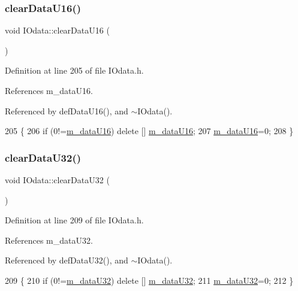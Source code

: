 \subsubsection{\texorpdfstring{clear\+Data\+U16()}{clearDataU16()}}
{\footnotesize\ttfamily void I\+Odata\+::clear\+Data\+U16 (\begin{DoxyParamCaption}{ }\end{DoxyParamCaption})\hspace{0.3cm}{\ttfamily [inline]}}



Definition at line 205 of file I\+Odata.\+h.



References m\+\_\+data\+U16.



Referenced by def\+Data\+U16(), and $\sim$\+I\+Odata().


\begin{DoxyCode}
205                      \{
206     \textcolor{keywordflow}{if} (0!=\hyperlink{classIOdata_a8d698e077b7898009691b9086a3e6453}{m\_dataU16}) \textcolor{keyword}{delete} [] \hyperlink{classIOdata_a8d698e077b7898009691b9086a3e6453}{m\_dataU16};
207     \hyperlink{classIOdata_a8d698e077b7898009691b9086a3e6453}{m\_dataU16}=0;
208   \}
\end{DoxyCode}
\mbox{\label{classIOdata_a848de1b6e7b7207dbb53c102a4d911a9}} 
\subsubsection{\texorpdfstring{clear\+Data\+U32()}{clearDataU32()}}
{\footnotesize\ttfamily void I\+Odata\+::clear\+Data\+U32 (\begin{DoxyParamCaption}{ }\end{DoxyParamCaption})\hspace{0.3cm}{\ttfamily [inline]}}



Definition at line 209 of file I\+Odata.\+h.



References m\+\_\+data\+U32.



Referenced by def\+Data\+U32(), and $\sim$\+I\+Odata().


\begin{DoxyCode}
209                      \{
210     \textcolor{keywordflow}{if} (0!=\hyperlink{classIOdata_a247cdaefd87084e3cad1d530d592d99a}{m\_dataU32}) \textcolor{keyword}{delete} [] \hyperlink{classIOdata_a247cdaefd87084e3cad1d530d592d99a}{m\_dataU32};
211     \hyperlink{classIOdata_a247cdaefd87084e3cad1d530d592d99a}{m\_dataU32}=0;
212   \}
\end{DoxyCode}
\mbox{\label{classIOdata_a9bc3ea0458ea6d13bd751ac4c80a4be6}} 
